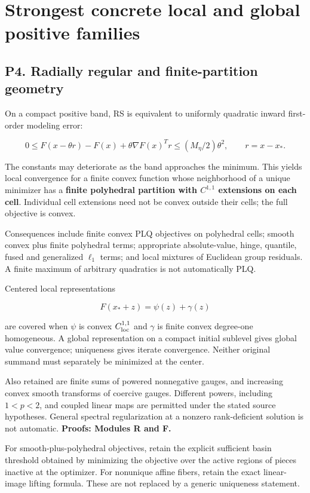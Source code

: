 \section{Strongest concrete local and global positive families}\label{strongest-concrete-local-and-global-positive-families}

\subsection{P4. Radially regular and finite-partition geometry}\label{p4.-radially-regular-and-finite-partition-geometry}

On a compact positive band, RS is equivalent to uniformly quadratic inward first-order modeling error:

\[
 0\le F(x-\theta r)-F(x)+\theta\nabla F(x)^Tr
 \le(M_\eta/2)\theta^2,\qquad r=x-x_*.
\]

The constants may deteriorate as the band approaches the minimum. This yields local convergence for a finite convex function whose neighborhood of a unique minimizer has a \textbf{finite polyhedral partition with \(C^{1,1}\) extensions on each cell}. Individual cell extensions need not be convex outside their cells; the full objective is convex.

Consequences include finite convex PLQ objectives on polyhedral cells; smooth convex plus finite polyhedral terms; appropriate absolute-value, hinge, quantile, fused and generalized \(\ell_1\) terms; and local mixtures of Euclidean group residuals. A finite maximum of arbitrary quadratics is not automatically PLQ.

Centered local representations

\[F(x_*+z)=\psi(z)+\gamma(z)\]

are covered when \(\psi\) is convex \(C^{1,1}_{\rm loc}\) and \(\gamma\) is finite convex degree-one homogeneous. A global representation on a compact initial sublevel gives global value convergence; uniqueness gives iterate convergence. Neither original summand must separately be minimized at the center.

Also retained are finite sums of powered nonnegative gauges, and increasing convex smooth transforms of coercive gauges. Different powers, including \(1<p<2\), and coupled linear maps are permitted under the stated source hypotheses. General spectral regularization at a nonzero rank-deficient solution is not automatic. \textbf{Proofs: Modules R and F.}

For smooth-plus-polyhedral objectives, retain the explicit sufficient basin threshold obtained by minimizing the objective over the active regions of pieces inactive at the optimizer. For nonunique affine fibers, retain the exact linear-image lifting formula. These are not replaced by a generic uniqueness statement.

